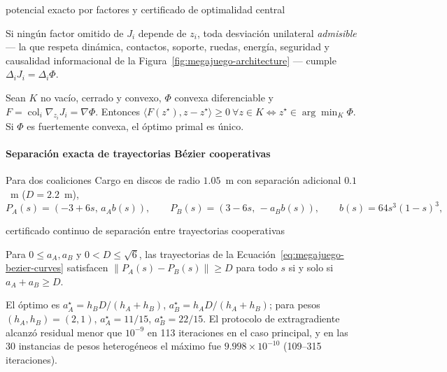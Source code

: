 \begin{contribucion}{potencial exacto por factores y certificado de optimalidad central}
\begin{proposicion}
\label{prop:megajuego-exact-potential}
Si ningún factor omitido de $J_i$ depende de $z_i$, toda desviación unilateral
\emph{admisible} --- la que respeta dinámica, contactos, soporte, ruedas,
energía, seguridad y causalidad informacional de la Figura~\ref{fig:megajuego-architecture} --- cumple $\Delta_iJ_i=\Delta_i\Phi$.
\end{proposicion}
\begin{teorema}
\label{thm:megajuego-central-optimum}
Sean $K$ no vacío, cerrado y convexo, $\Phi$ convexa diferenciable y $F=\operatorname{col}_i\nabla_{z_i}J_i=\nabla\Phi$. Entonces $\langle F(z^\star),z-z^\star\rangle\geq0\ \forall z\in K \iff z^\star\in\arg\min_K\Phi$. Si $\Phi$ es fuertemente convexa, el óptimo primal es único.
\end{teorema}
\end{contribucion}

\paragraph{Separación exacta de trayectorias Bézier cooperativas}
Para dos coaliciones Cargo en discos de radio $1.05$~m con separación
adicional $0.1$~m ($D=2.2$~m),
\begin{equation}
 P_A(s)=(-3+6s,\,a_Ab(s)),\qquad P_B(s)=(3-6s,\,-a_Bb(s)),\qquad b(s)=64s^3(1-s)^3,
 \label{eq:megajuego-bezier-curves}
\end{equation}

\begin{contribucion}{certificado continuo de separación entre trayectorias cooperativas}
\begin{teorema}
\label{thm:megajuego-bezier-separation}
Para $0\leq a_A,a_B$ y $0<D\leq\sqrt6$, las trayectorias de la
Ecuación~\eqref{eq:megajuego-bezier-curves} satisfacen $\|P_A(s)-P_B(s)\|\geq D$ para todo $s$ si y solo si $a_A+a_B\geq D$.
\end{teorema}
El óptimo es $a_A^\star=h_BD/(h_A+h_B)$, $a_B^\star=h_AD/(h_A+h_B)$; para pesos
$(h_A,h_B)=(2,1)$, $a_A^\star=11/15$, $a_B^\star=22/15$. El protocolo de
extragradiente alcanzó residual menor que $10^{-9}$ en 113 iteraciones en el
caso principal, y en las 30 instancias de pesos heterogéneos el máximo fue
$9.998\times10^{-10}$ (109--315 iteraciones).
\end{contribucion}


